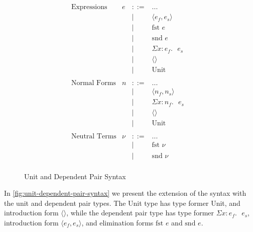 \documentclass{article}
\newcommand{\bnfdef}{::=}
\newcommand{\bnfalt}{\mid}
\newcommand{\pairE}[2]{\langle #1, #2 \rangle}
\newcommand{\fstE}[1]{\text{fst } #1}
\newcommand{\sndE}[1]{\text{snd } #1}
\newcommand{\sigmaE}[3]{\Sigma #1 : #2. \text{ } #3}
\newcommand{\unitE}{\langle \rangle}
\newcommand{\unittE}{\text{Unit}}
\begin{document}
\begin{figure}[!htb]
  \begin{displaymath}
    \begin{array}{lrcll}
      \text{Expressions} & e & \bnfdef & ... & \\
      & & \bnfalt & \pairE{e_f}{e_s} & \\
      & & \bnfalt & \fstE{e} & \\
      & & \bnfalt & \sndE{e} & \\
      & & \bnfalt & \sigmaE{x}{e_f}{e_s} & \\
      & & \bnfalt & \unitE & \\
      & & \bnfalt & \unittE & \\
      \\
      \text{Normal Forms} & n & \bnfdef & ... & \\
      & & \bnfalt & \pairE{n_f}{n_s} & \\
      & & \bnfalt & \sigmaE{x}{n_f}{e_s} & \\
      & & \bnfalt & \unitE & \\
      & & \bnfalt & \unittE & \\
      \\
      \text{Neutral Terms} & \nu & \bnfdef & ... & \\
      & & \bnfalt & \fstE{\nu} & \\
      & & \bnfalt & \sndE{\nu} & \\
    \end{array}
  \end{displaymath}
  \caption{Unit and Dependent Pair Syntax}
  \label{fig:unit-dependent-pair-syntax}
\end{figure}

In \autoref{fig:unit-dependent-pair-syntax} we present the extension of the syntax with the unit and dependent pair types.
The Unit type has type former Unit, and introduction form $\unitE$, while the dependent pair type has type former $\sigmaE{x}{e_f}{e_s}$, introduction form $\pairE{e_f}{e_s}$, and elimination forms $\fstE{e}$ and $\sndE{e}$.
\end{document}
